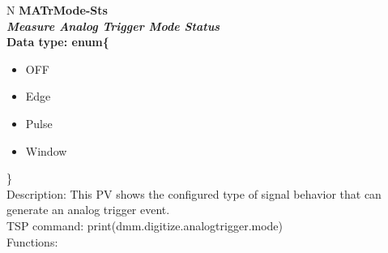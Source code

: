 \documentclass[openany]{article}
\begin{document}
		\begin{tabular}{N}
			\hline
			\bfseries MATrMode-Sts\label{pv:matrmode-sts} \\ \hline
			\emph{Measure Analog Trigger Mode Status} \\
			Data type: enum\{\begin{itemize}[noitemsep]
				\small
				\item[] OFF
				\item[] Edge
				\item[] Pulse
				\item[] Window
			\end{itemize}\} \\
			Description: This PV shows the configured type of signal behavior that can generate an analog trigger event. \\
			TSP command: print(dmm.digitize.analogtrigger.mode) \\
			Functions: \\
			\arrayrulecolor{\FuncTableBorderColor}

		\end{tabular}
\end{document}
